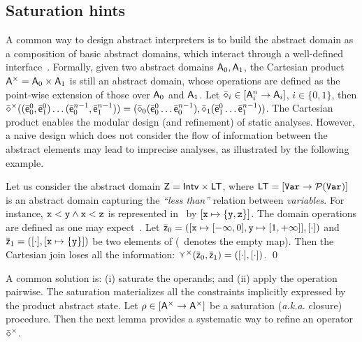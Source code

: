 \documentclass{llncs}
\begin{document}
\subsection{Saturation hints}
A common way to design abstract interpreters is to build the abstract domain as a composition of basic abstract domains, which interact through a well-defined interface~\cite{CousotEtAl06,GulwaniEtAl08}.
Formally, given two abstract domains ${\mathsf{A}}_0,{\mathsf{A}}_{1}$, the Cartesian product ${\mathsf{A}}^\times = {\mathsf{A}}_0 \times {\mathsf{A}}_{1}$ is still an abstract domain, whose operations are defined as the point-wise extension of those over ${\mathsf{A}}_0$ and ${\mathsf{A}}_{1}$.
Let $\bar{\mathsf{\mathsf{\diamond}}}_i \in [{\mathsf{A}}_i^n \rightarrow{\mathsf{A}}_i]$, $i \in \{ 0, 1\}$, then $\bar{\mathsf{\mathsf{\diamond}}}^\times((\bar{\mathsf{\mathsf{e}}}^0_0, \bar{\mathsf{\mathsf{e}}}^0_1) \dots (\bar{\mathsf{\mathsf{e}}}^{n-1}_0, \bar{\mathsf{\mathsf{e}}}^{n-1}_1)) = (\bar{\mathsf{\mathsf{\diamond}}}_0(\bar{\mathsf{\mathsf{e}}}^0_0 \dots\bar{\mathsf{\mathsf{e}}}^{n-1}_0), \bar{\mathsf{\mathsf{\diamond}}}_1(\bar{\mathsf{\mathsf{e}}}^{0}_1 \dots \bar{\mathsf{\mathsf{e}}}^{n-1}_1))$.
The Cartesian product enables the modular design (and refinement) of static analyses.
However, a naive design which does not consider the flow of information between the abstract elements may lead to imprecise analyses, as illustrated by the following example.

\begin{example}
\label{ex:cartesian}
Let us consider the abstract domain ${\mathsf{Z}} = \mathsf{Intv} \times \mathsf{LT}$, where $\mathsf{LT} = [\mathtt{Var} \rightarrow\mathcal{P}{(\mathtt{Var})}]$ is an abstract domain capturing the \emph{``less than''} relation between \emph{variables}.
For instance, $\mathtt{x} < \mathtt{y} \wedge \mathtt{x} < \mathtt{z}$ is represented in \LT\ by $[ \mathtt{x} \mapsto \{ \mathtt{y}, \mathtt{z}\}]$.
The domain operations are defined as one may expect~\cite{LogozzoMaf08}.
Let $\bar{\mathsf{\mathsf{z}}}_0 = ([\mathtt{x} \mapsto [-\infty, 0], \mathtt{y} \mapsto [1, +\infty]], [\cdot] )$ and $\bar{\mathsf{\mathsf{z}}}_1 = ([\cdot], [\mathtt{x} \mapsto \{ \mathtt{y}\}]  )$ be two elements of  (\emptyfun\ denotes the empty map).
Then the Cartesian join loses all the information: $\curlyvee^\times(\bar{\mathsf{\mathsf{z}}}_0, \bar{\mathsf{\mathsf{z}}}_1) = ([\cdot], [\cdot] )$. \qed
\end{example}

A common solution is: (i) saturate the operands; and (ii)  apply the operation pairwise.
The saturation materializes all the constraints implicitly expressed
by the product abstract state.
Let $\rho \in [{\mathsf{A}}^\times \rightarrow{\mathsf{A}}^\times]$ be a saturation (\emph{a.k.a.} closure) procedure.
Then the next lemma provides a systematic way to refine an operator $\bar{\mathsf{\mathsf{\diamond}}}^\times$.
\end{document}
